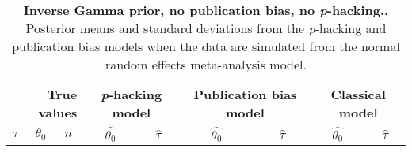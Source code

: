 \begin{table}[ht]
\centering
\caption{{\bf Inverse Gamma prior, no publication bias, no 
                    \textit{p}-hacking..} Posterior means and 
                    standard deviations from the \textit{p}-hacking and 
                    publication bias models when the data are simulated 
                    from the normal random effects meta-analysis model.}
\label{tab:Simulation_ph}
\begin{tabular}{lllrrrrrr}
   \multicolumn{3}{r}{\textbf{True values}} & 
       \multicolumn{2}{c}{\textbf{\textit{p}-hacking model}} &
       \multicolumn{2}{c}{\textbf{Publication bias model}} &
       \multicolumn{2}{c}{\textbf{Classical model}}\\$\tau$ & $\theta_0$ & $n$ & \multicolumn{1}{c}{$\widehat{\theta_0}$} & \multicolumn{1}{c}{$\widehat{\tau}$} & \multicolumn{1}{c}{$\widehat{\theta_0}$} & \multicolumn{1}{c}{$\widehat{\tau}$} & \multicolumn{1}{c}{$\widehat{\theta_0}$} & \multicolumn{1}{c}{$\widehat{\tau}$} \\ 
   \hline
   

\end{tabular}
\end{table}
